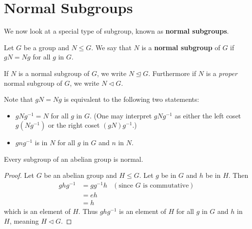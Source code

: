 \section{Normal Subgroups}
We now look at a special type of subgroup, known as \textbf{normal subgroups}.
\begin{definition}
    Let $G$ be a group and $N \leq G$. We say that $N$ is a \textbf{normal subgroup} of $G$ if $gN = Ng$ for all $g$ in $G$.
\end{definition}
If $N$ is a normal subgroup of $G$, we write $N \unlhd G$. Furthermore if $N$ is a \textit{proper} normal subgroup of $G$, we write $N \lhd G$.

Note that $gN = Ng$ is equivalent to the following two statements:
\begin{itemize}
    \item $gNg^{-1} = N$ for all $g$ in $G$. (One may interpret $gNg^{-1}$ as either the left coset $g(Ng^{-1})$ or the right coset $(gN)g^{-1}$.)
    \item $gng^{-1}$ is in $N$ for all $g$ in $G$ and $n$ in $N$.
\end{itemize}

\newpage

\begin{proposition}\label{prop-subgroup-of-abelian-group-is-normal}
    Every subgroup of an abelian group is normal.
\end{proposition}
\begin{proof}
    Let $G$ be an abelian group and $H \leq G$. Let $g$ be in $G$ and $h$ be in $H$. Then
    \begin{align*}
        ghg^{-1} &= gg^{-1}h & (\text{since }G \text{ is commutative})\\
        &= eh\\
        &= h
    \end{align*}
    which is an element of $H$. Thus $ghg^{-1}$ is an element of $H$ for all $g$ in $G$ and $h$ in $H$, meaning $H \lhd G$.
\end{proof}

